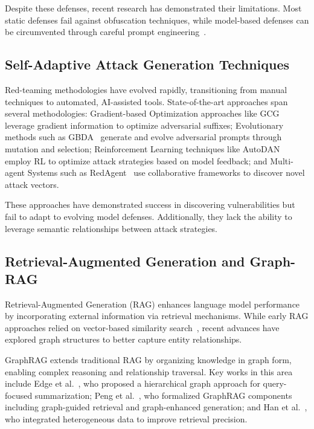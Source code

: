 Despite these defenses, recent research has demonstrated their limitations. Most static defenses fail against obfuscation techniques, while model-based defenses can be circumvented through careful prompt engineering~\cite{zou2023universal}.

\subsection{Self-Adaptive Attack Generation Techniques}

Red-teaming methodologies have evolved rapidly, transitioning from manual techniques to automated, AI-assisted tools. State-of-the-art approaches span several methodologies: Gradient-based Optimization approaches like GCG~\cite{zou2023universal} leverage gradient information to optimize adversarial suffixes; Evolutionary methods such as GBDA~\cite{guo2021gradient} generate and evolve adversarial prompts through mutation and selection; Reinforcement Learning techniques like AutoDAN~\cite{liu2023autodan} employ RL to optimize attack strategies based on model feedback; and Multi-agent Systems such as RedAgent~\cite{xu2024redagent} use collaborative frameworks to discover novel attack vectors.

These approaches have demonstrated success in discovering vulnerabilities but fail to adapt to evolving model defenses. Additionally, they lack the ability to leverage semantic relationships between attack strategies.

\subsection{Retrieval-Augmented Generation and Graph-RAG}

Retrieval-Augmented Generation (RAG) enhances language model performance by incorporating external information via retrieval mechanisms. While early RAG approaches relied on vector-based similarity search~\cite{lewis2020retrieval}, recent advances have explored graph structures to better capture entity relationships.

GraphRAG extends traditional RAG by organizing knowledge in graph form, enabling complex reasoning and relationship traversal. Key works in this area include Edge et al.~\cite{edge2024local}, who proposed a hierarchical graph approach for query-focused summarization; Peng et al.~\cite{peng2024graph}, who formalized GraphRAG components including graph-guided retrieval and graph-enhanced generation; and Han et al.~\cite{han2024retrieval}, who integrated heterogeneous data to improve retrieval precision.


